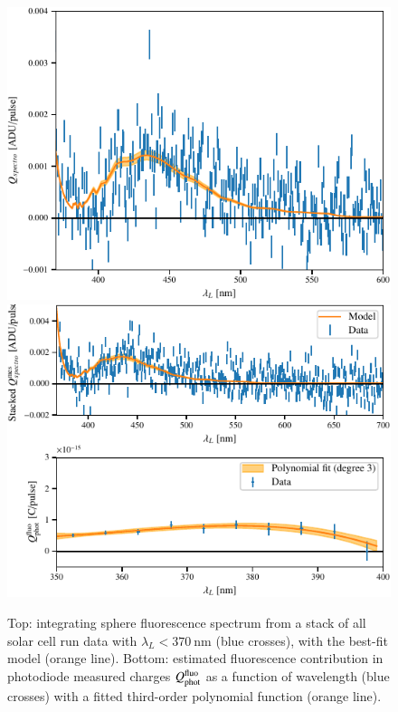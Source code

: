 \begin{figure}[h]
    \centering
    \includegraphics[width=\columnwidth]{fig/spectro_stack_fluo_model.pdf}
    \includegraphics[width=\columnwidth]{fig/QPDfluo_model.pdf}
    \caption{Top: integrating sphere fluorescence spectrum from a stack of all solar cell run data with $\lambda_L < \SI{370}{\nano\meter}$ (blue crosses), with the best-fit model (orange line). Bottom: estimated fluorescence contribution in photodiode measured charges $Q_{\mathrm{phot}}^{\rm fluo}$ as a function of wavelength (blue crosses) with a fitted third-order polynomial function (orange line).}
    \label{fig:fluo}
\end{figure}

